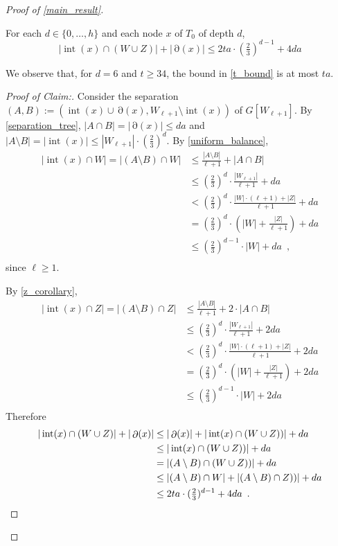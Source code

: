 \documentclass{patmorin}
\newenvironment{clmproof}{\begin{proof}[Proof of Claim:]\renewcommand{\qedsymbol}{\rule{1ex}{1ex}}}{\end{proof}}
\DeclareMathOperator{\interior}{int}
\DeclareMathOperator{\boundary}{\partial}
\begin{document}
\begin{proof}[Proof of \cref{main_result}]
 \begin{clm} \label{cell_bound}
   For each $d\in\{0,\ldots,h\}$ and each node $x$ of $T_0$ of depth $d$, 
   \begin{equation}
     |\interior(x)\cap (W\cup Z)|+|\boundary(x)| \le 2ta\cdot (\tfrac{2}{3})^{d-1}+4da \label{t_bound}
   \end{equation}
 \end{clm}

  We observe that, for $d=6$ and $t\ge 34$, the bound in \eqref{t_bound} is at most $ta$.

 \begin{clmproof}
   Consider the separation $(A,B):=(\interior(x)\cup\boundary(x),W_{\ell+1}\setminus\interior(x))$ of $G[W_{\ell+1}]$.
   By \cref{separation_tree}, $|A\cap B|=|\boundary(x)|\le da$ and $|A\setminus B|=|\interior(x)|\le |W_{\ell+1}|\cdot (\tfrac{2}{3})^{d}$.  By \cref{uniform_balance},
   \begin{align*}
     |\interior(x)\cap W| = |(A\setminus B)\cap W| & \le \frac{|A\setminus B|}{\ell+1} +  |A\cap B| \\
     & \le (\tfrac{2}{3})^d\cdot \frac{|W_{\ell+1}|}{\ell+1} + da \\
     & < (\tfrac{2}{3})^d\cdot \frac{|W|\cdot (\ell+1)+|Z|}{\ell+1} + da \\
     & = (\tfrac{2}{3})^d\cdot \left(|W|+\frac{|Z|}{\ell+1}\right) +  da \\
     & \le (\tfrac{2}{3})^{d-1}\cdot|W| + da \enspace , \\
   \end{align*}
   since $\ell\ge 1$.
   
   By \cref{z_corollary},
   \begin{align*}
     |\interior(x)\cap Z| = |(A\setminus B)\cap Z| & \le \frac{|A\setminus B|}{\ell+1} + 2\cdot |A\cap B| \\
     & \le (\tfrac{2}{3})^d\cdot \frac{|W_{\ell+1}|}{\ell+1} + 2da \\
     & < (\tfrac{2}{3})^d\cdot \frac{|W|\cdot (\ell+1)+|Z|}{\ell+1} + 2da \\
     & = (\tfrac{2}{3})^d\cdot \left(|W|+\frac{|Z|}{\ell+1}\right) + 2da \\
     & \le (\tfrac{2}{3})^{d-1}\cdot|W| + 2da \\
   \end{align*}
   Therefore
   \begin{align*}
      |\interior(x)\cap (W\cup Z)| + |\boundary(x)|  
        & \le |\boundary(x)| + |\interior(x)\cap (W\cup Z))| + da\\
        & \le |\interior(x)\cap (W\cup Z))| + da \\
        & = |(A\setminus B)\cap (W\cup Z))| + da \\
        & \le |(A\setminus B)\cap W| + |(A\setminus B)\cap Z))| + da \\
        & \le 2ta\cdot(\tfrac{2}{3})^{d-1} + 4da \enspace . \qedhere
   \end{align*}
 \end{clmproof}


\end{proof}
\end{document}
